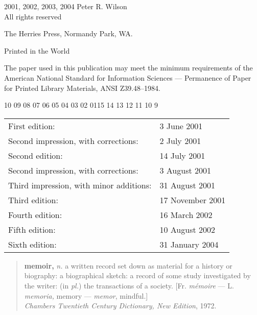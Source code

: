 \documentclass[10pt,letterpaper]{memoir}
\begin{document}
\begingroup
\footnotesize
\setlength{\parindent}{0pt}
\setlength{\parskip}{\baselineskip}
\textcopyright{} 2001, 2002, 2003, 2004 Peter R. Wilson \\
All rights reserved

The Herries Press, Normandy Park, WA.

Printed in the World 

The paper used in this publication may meet the minimum requirements
of the American National Standard for Information 
Sciences --- Permanence of Paper for Printed Library Materials, 
ANSI Z39.48--1984.

\begin{center}
10 09 08 07 06 05 04 03 02 01\hspace{2em}15 14 13 12 11 10 9       
\end{center}
\begin{center}
\begin{tabular}{ll}
First edition:                        & 3 June 2001 \\
Second impression, with corrections:    & 2 July 2001 \\
Second edition:                       & 14 July 2001 \\
Second impression, with corrections:    & 3 August 2001 \\
Third impression, with minor additions: & 31 August 2001 \\
Third edition:                        & 17 November 2001 \\
Fourth edition:                       & 16 March 2002 \\
Fifth edition:                        & 10 August 2002 \\
Sixth edition:                        & 31 January 2004 \\
\end{tabular}
\end{center}

\endgroup

\clearpage
\vspace*{\fill}
\begin{quote}
\textbf{memoir,} \textit{n.} a written record set down as material
  for a history or biography: 
  a biographical sketch:
  a record of some study investigated by the writer:
  (in \textit{pl.}) the transactions of a society.
  [Fr. \textit{m\'{e}moire} --- L. \textit{memoria,} memory ---
   \textit{memor}, mindful.] \\[0.5\baselineskip]
  \hspace*{\fill} 
      \textit{Chambers Twentieth Century Dictionary, New Edition}, 1972.
\end{quote}
\end{document}
